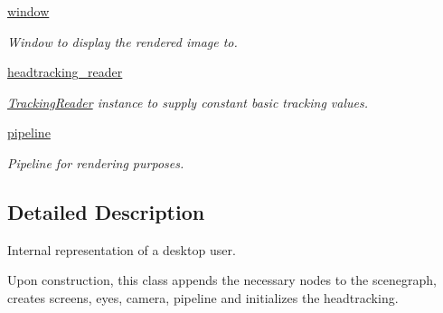 \begin{DoxyCompactItemize}
\hyperlink{classlib_1_1DesktopUser_1_1DesktopUser_a964bd1b8e0265b2cf4bda0708c7b155f}{window}
\begin{DoxyCompactList}\small\item\em \-Window to display the rendered image to. \end{DoxyCompactList}\item 
\hyperlink{classlib_1_1DesktopUser_1_1DesktopUser_a10bd43f5142577a1aedfbc3c632170f4}{headtracking\-\_\-reader}
\begin{DoxyCompactList}\small\item\em \hyperlink{namespacelib_1_1TrackingReader}{\-Tracking\-Reader} instance to supply constant basic tracking values. \end{DoxyCompactList}\item 
\hyperlink{classlib_1_1DesktopUser_1_1DesktopUser_ad56a3bf4fbc33e2ccb95e3ce9bcd08ee}{pipeline}
\begin{DoxyCompactList}\small\item\em \-Pipeline for rendering purposes. \end{DoxyCompactList}\end{DoxyCompactItemize}


\subsection{\-Detailed \-Description}
\-Internal representation of a desktop user. 

\-Upon construction, this class appends the necessary nodes to the scenegraph, creates screens, eyes, camera, pipeline and initializes the headtracking. 

